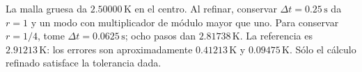 La malla gruesa da \(2.50000\,\mathrm K\) en el centro. Al refinar, conservar \(\Delta t=0.25\,\mathrm s\) da \(r=1\) y un modo con multiplicador de módulo mayor que uno. Para conservar \(r=1/4\), tome \(\Delta t=0.0625\,\mathrm s\); ocho pasos dan \(2.81738\,\mathrm K\). La referencia es \(2.91213\,\mathrm K\): los errores son aproximadamente \(0.41213\,\mathrm K\) y \(0.09475\,\mathrm K\). Sólo el cálculo refinado satisface la tolerancia dada.
